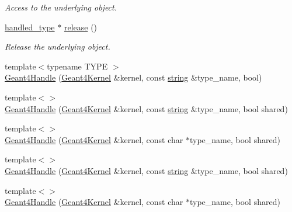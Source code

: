 \begin{DoxyCompactItemize}
\begin{DoxyCompactList}\small\item\em Access to the underlying object. \item\end{DoxyCompactList}\item 
\hyperlink{class_d_d4hep_1_1_simulation_1_1_geant4_handle_a35e583b9228e38c95d23112ad19b645d}{handled\_\-type} $\ast$ \hyperlink{class_d_d4hep_1_1_simulation_1_1_geant4_handle_a09da8eea7f4d324e8f5dcdc6b53bb861}{release} ()
\begin{DoxyCompactList}\small\item\em Release the underlying object. \item\end{DoxyCompactList}\item 
{\footnotesize template$<$typename TYPE $>$ }\\\hyperlink{class_d_d4hep_1_1_simulation_1_1_geant4_handle_acb0ba7283673cbb6a5afcf44703ce206}{Geant4Handle} (\hyperlink{class_d_d4hep_1_1_simulation_1_1_geant4_kernel}{Geant4Kernel} \&kernel, const \hyperlink{classstd_1_1string}{string} \&type\_\-name, bool)
\item 
{\footnotesize template$<$$>$ }\\\hyperlink{class_d_d4hep_1_1_simulation_1_1_geant4_handle_ad5bdbeb7b854db18b4da3888f46dcd0f}{Geant4Handle} (\hyperlink{class_d_d4hep_1_1_simulation_1_1_geant4_kernel}{Geant4Kernel} \&kernel, const \hyperlink{classstd_1_1string}{string} \&type\_\-name, bool shared)
\item 
{\footnotesize template$<$$>$ }\\\hyperlink{class_d_d4hep_1_1_simulation_1_1_geant4_handle_ad5d8cc81c0f454398d4e020851e3775a}{Geant4Handle} (\hyperlink{class_d_d4hep_1_1_simulation_1_1_geant4_kernel}{Geant4Kernel} \&kernel, const char $\ast$type\_\-name, bool shared)
\item 
{\footnotesize template$<$$>$ }\\\hyperlink{class_d_d4hep_1_1_simulation_1_1_geant4_handle_aa2d10009e397e7301ebe1a6eb87aee52}{Geant4Handle} (\hyperlink{class_d_d4hep_1_1_simulation_1_1_geant4_kernel}{Geant4Kernel} \&kernel, const \hyperlink{classstd_1_1string}{string} \&type\_\-name, bool shared)
\item 
{\footnotesize template$<$$>$ }\\\hyperlink{class_d_d4hep_1_1_simulation_1_1_geant4_handle_a3d9d3747c9c2fb8c6ed4cdf2ff4c5d63}{Geant4Handle} (\hyperlink{class_d_d4hep_1_1_simulation_1_1_geant4_kernel}{Geant4Kernel} \&kernel, const char $\ast$type\_\-name, bool shared)

\end{DoxyCompactItemize}

